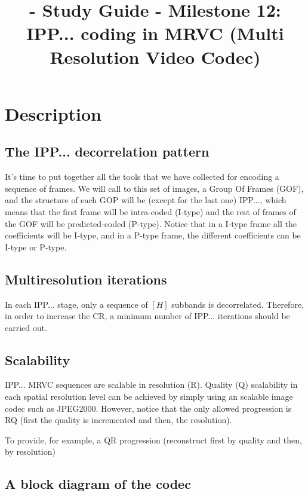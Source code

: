
\title{\SM{} - Study Guide - Milestone 12: IPP... coding in MRVC (Multi Resolution Video Codec)}

\maketitle

\section{Description}

\subsection{The IPP... decorrelation pattern}
It's time to put together all the tools that we have collected for
encoding a sequence of frames. We will call to this set of images, a
Group Of Frames (GOF), and the structure of each GOP will be (except
for the last one) IPP..., which means that the first frame will be
intra-coded (I-type) and the rest of frames of the GOF will be
predicted-coded (P-type). Notice that in a I-type frame all the
coefficients will be I-type, and in a P-type frame, the different
coefficients can be I-type or P-type.

\subsection{Multiresolution iterations}
In each IPP... stage, only a sequence of $[H]$ subbands is
decorrelated. Therefore, in order to increase the CR, a minimum number
of IPP... iterations should be carried out.

\subsection{Scalability}
IPP... MRVC sequences are scalable in resolution (R). Quality (Q)
scalability in each spatial resolution level can be achieved by simply
using an scalable image codec such as JPEG2000. However, notice that
the only allowed progression is RQ (first the quality is incremented
and then, the resolution).

To provide, for example, a QR progression (reconstruct first by
quality and then, by resolution)

\subsection{A block diagram of the codec}

